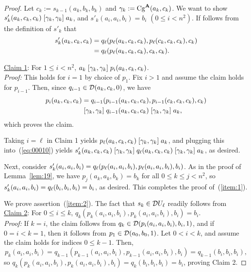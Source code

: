   \begin{proof}
    Let $c_k := s_{k-1}(a_k, b_k, b_k)$ and $\gamma_k:= \operatorname{Cg}^{\mathbf{A}}(a_k, c_k)$.  
    We want to show
    $s'_k(a_k, c_k, c_k) \mathrel{[\gamma_k, \gamma_k]} a_k$, and 
    $s'_k(a_i, a_i, b_i) = b_i$ $(0\leq i < n^2)$.
    If follows from the definition of $s'_k$ that 
    \begin{align}
      s'_k(a_k, c_k, c_k) &=  
      q_{\ell}( p_{\ell}(a_k, c_k, c_k),   p_{\ell}(c_k, c_k, c_k), c_k )\nonumber\\
      &=q_{\ell}( p_{\ell}(a_k, c_k, c_k),   c_k, c_k ).\label{eq:00010}
    \end{align}
    
  \noindent \underline{Claim 1}: For $1\leq i < n^2$, 
  $a_k \mathrel{[\gamma_k, \gamma_k]} p_i(a_k, c_k,c_k)$.\\[4pt]
  \emph{Proof:} This holds for $i=1$ by choice of $p_1$.  Fix $i>1$ and assume the claim holds 
  for $p_{i-1}$.  Then, since $q_{i-1}\in \mathcal{D} (a_k, c_k, 0)$, we have
  \begin{align*}
    p_i(a_k, c_k, c_k)&= 
    q_{i-1}(p_{i-1}(a_k, c_k, c_k), p_{i-1}(c_k, c_k, c_k), c_k)\\
    & \mathrel{[\gamma_k, \gamma_k]} q_{i-1}(a_k, c_k, c_k) \mathrel{[\gamma_k, \gamma_k]}  a_k,
  \end{align*}
  which proves the claim. 
  
  Taking $i=\ell$ in Claim 1 yields
  $p_{\ell}(a_k, c_k, c_k)\mathrel{[\gamma_k, \gamma_k]} a_k$, and plugging this into~(\ref{eq:00010}) yields
  $s'_k(a_k, c_k, c_k) \mathrel{[\gamma_k, \gamma_k]} q_{\ell}( a_k, c_k, c_k ) \mathrel{[\gamma_k, \gamma_k]} a_k$, as desired.
  
  Next, consider 
$s'_k(a_i, a_i, b_i) =  
    q_{\ell}( p_{\ell}(a_i, a_i, b_i),   p_{\ell}(a_i, a_i, b_i), b_i )$.
  As in the proof of Lemma~\ref{lem:19}, we have $p_j(a_k, a_k, b_k) = b_k$
  for all $0 \leq k\leq j < n^2$, so 
  $s'_k(a_i, a_i, b_i) =  q_{\ell}( b_i,  b_i, b_i ) = b_i$, as desired.
This completes the proof of~(\ref{item:1}).

We prove assertion~(\ref{item:2}). The fact that 
$s_k \in \mathcal{D} U_\ell$ readily follows from\\[4pt]
\noindent \underline{Claim 2}: For $0\leq i \leq k$, $q_k(p_k(a_i, a_i,b_i), p_k(a_i, a_i,b_i), b_i) = b_i$.\\[4pt]
\emph{Proof:} If $k=i$, the claim follows from 
$q_k \in \mathcal{D} (p_i(a_i, a_i, b_i), b_i, 1)$, and if $0=i<k=1$, then it follows from
$p_1 \in \mathcal{D} (a_0, b_0, 1)$.  Let $0<i<k$, and assume 
the claim holds for indices $0 \leq k-1$. Then,
\[
  p_k(a_i, a_i,b_i) = q_{k-1}(p_{k-1}(a_i, a_i,b_i), p_{k-1}(a_i, a_i,b_i), b_i) = q_{k-1}(b_i, b_i, b_i),      
\]
so $q_k(p_k(a_i, a_i,b_i), p_k(a_i, a_i,b_i), b_i) = q_k(b_i, b_i, b_i) = b_i$, 
proving Claim 2.


\end{proof}

